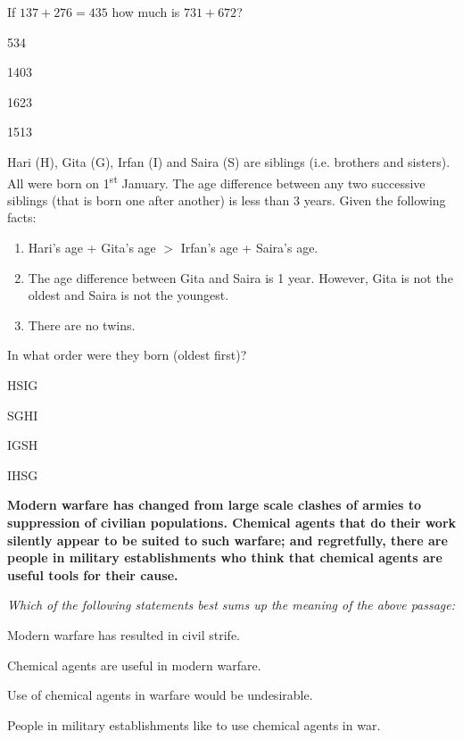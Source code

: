 \documentclass{exam}
\begin{document}
\begin{questions}
\question If $137 + 276 = 435$ how much is $731 + 672$?\hfill{}

\begin{enumerate} \begin{multicols}{4}
	\item 534 \item 1403 \item 1623 \item 1513
\end{multicols} \end{enumerate}

\question Hari (H), Gita (G), Irfan (I) and Saira (S) are siblings (i.e. brothers and sisters). All were born on 1\textsuperscript{st} January. The age difference between any two successive siblings (that is born one after another) is less than 3 years. Given the following facts:

\begin{enumerate}
		\item Hari's age + Gita's age $>$ Irfan's age + Saira's age.
		\item The age difference between Gita and Saira is 1 year. However, Gita is not the oldest and Saira is not the youngest.
		\item There are no twins.
	\end{enumerate}
	In what order were they born (oldest first)?\hfill{}


\begin{enumerate} \begin{multicols}{4}
	\item HSIG \item SGHI \item IGSH \item IHSG
\end{multicols} \end{enumerate}

\question \textbf{Modern warfare has changed from large scale clashes of armies to suppression of civilian populations. Chemical agents that do their work silently appear to be suited to such warfare; and regretfully, there are people in military establishments who think that chemical agents are useful tools for their cause.}
	\par\noindent \textit{Which of the following statements best sums up the meaning of the above passage:}\hfill{}

\begin{enumerate} \begin{multicols}{4}
	\item Modern warfare has resulted in civil strife.
	\item Chemical agents are useful in modern warfare.
	\item Use of chemical agents in warfare would be undesirable.
	\item People in military establishments like to use chemical agents in war.
\end{multicols} \end{enumerate}


\end{questions}
\end{document}
